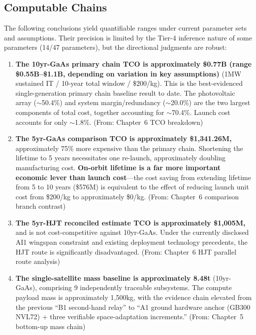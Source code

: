 \subsection{Computable Chains}

The following conclusions yield quantifiable ranges under current parameter sets and assumptions. Their precision is limited by the Tier-4 inference nature of some parameters (14/47 parameters), but the directional judgments are robust:

\begin{enumerate}[leftmargin=*]
    \item \textbf{The 10yr-GaAs primary chain TCO is approximately \$0.77B (range \$0.55B--\$1.1B, depending on variation in key assumptions)} (1\;MW sustained IT / 10-year total window / \$200/kg). This is the best-evidenced single-generation primary chain baseline result to date. The photovoltaic array ($\sim$50.4\%) and system margin/redundancy ($\sim$20.0\%) are the two largest components of total cost, together accounting for $\sim$70.4\%. Launch cost accounts for only $\sim$1.8\%. (From: Chapter~6 TCO breakdown)

    \item \textbf{The 5yr-GaAs comparison TCO is approximately \$1,341.26M,} approximately 75\% more expensive than the primary chain. Shortening the lifetime to 5 years necessitates one re-launch, approximately doubling manufacturing cost. \textbf{On-orbit lifetime is a far more important economic lever than launch cost}---the cost saving from extending lifetime from 5 to 10 years (\$576M) is equivalent to the effect of reducing launch unit cost from \$200/kg to approximately \$0/kg. (From: Chapter~6 comparison branch contrast)

    \item \textbf{The 5yr-HJT reconciled estimate TCO is approximately \$1,005M,} and is not cost-competitive against 10yr-GaAs. Under the currently disclosed AI1 wingspan constraint and existing deployment technology precedents, the HJT route is significantly disadvantaged. (From: Chapter~6 HJT parallel route analysis)

    \item \textbf{The single-satellite mass baseline is approximately 8.48\;t} (10yr-GaAs), comprising 9 independently traceable subsystems. The compute payload mass is approximately 1,500\;kg, with the evidence chain elevated from the previous ``B1 second-hand relay'' to ``A1 ground hardware anchor (GB300 NVL72) + three verifiable space-adaptation increments.'' (From: Chapter~5 bottom-up mass chain)


\end{enumerate}
